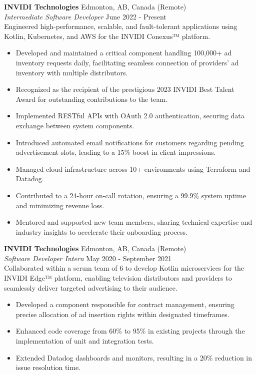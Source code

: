 \documentclass[a4paper]{article}
\begin{document}
\textbf{INVIDI Technologies} \hfill Edmonton, AB, Canada (Remote)\\
\textit{Intermediate Software Developer} \hfill June 2022 - Present \\
Engineered high-performance, scalable, and fault-tolerant applications using Kotlin, Kubernetes, and AWS for the INVIDI Conexus™ platform.
\vspace{-1mm}
\begin{itemize} \itemsep 1pt
    \item Developed and maintained a critical component handling 100,000+ ad inventory requests daily, facilitating seamless connection of providers' ad inventory with multiple distributors.
    \item Recognized as the recipient of the prestigious 2023 INVIDI Best Talent Award for outstanding contributions to the team.
    \item Implemented RESTful APIs with OAuth 2.0 authentication, securing data exchange between system components.
	\item Introduced automated email notifications for customers regarding pending advertisement slots, leading to a 15\% boost in client impressions.
    \item Managed cloud infrastructure across 10+ environments using Terraform and Datadog.
    \item Contributed to a 24-hour on-call rotation, ensuring a 99.9\% system uptime and minimizing revenue loss.
    \item Mentored and supported new team members, sharing technical expertise and industry insights to accelerate their onboarding process.
\end{itemize}
\vspace{1mm}

\textbf{INVIDI Technologies} \hfill Edmonton, AB, Canada (Remote)\\
\textit{Software Developer Intern} \hfill May 2020 - September 2021\\
Collaborated within a scrum team of 6 to develop Kotlin microservices for the INVIDI Edge™ platform, enabling television distributors and providers to seamlessly deliver targeted advertising to their audience.
\vspace{-1mm}
\begin{itemize} \itemsep 1pt
    \item Developed a component responsible for contract management, ensuring precise allocation of ad insertion rights within designated timeframes.
	\item Enhanced code coverage from 60\% to 95\% in existing projects through the implementation of unit and integration tests.
	\item Extended Datadog dashboards and monitors, resulting in a 20\% reduction in issue resolution time.
\end{itemize}
\end{document}
